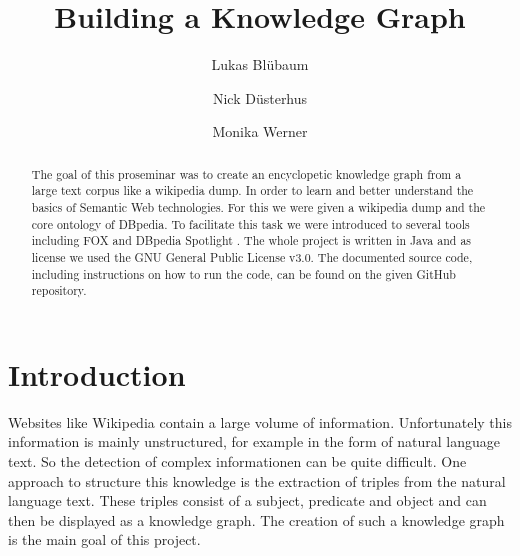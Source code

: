 \documentclass[runningheads]{llncs}
\begin{document}
%
\title{Building a Knowledge Graph}
%
%
\renewcommand*\labelitemi{\textbullet}
\author{Lukas Bl{\"u}baum \and Nick D{\"u}sterhus \and Monika Werner}
%
%
%
\maketitle              %
%
\begin{abstract}
The goal of this proseminar was to create an encyclopetic knowledge graph from a large text corpus like a wikipedia dump. In order to learn and better understand the basics of Semantic Web technologies. For this we were given a wikipedia dump and the core ontology of DBpedia. To facilitate this task we were introduced to several tools including FOX \cite{fox} and DBpedia Spotlight \cite{spotlight}. The whole project is written in Java and as license we used the GNU General Public License v3.0. The documented source code, including instructions on how to run the code, can be found on the given GitHub repository.

\end{abstract}


\section{Introduction}
Websites like Wikipedia contain a large volume of information. Unfortunately this information is mainly unstructured, for example in the form of natural language text. So the detection of complex informationen can be quite difficult. One approach to structure this knowledge is the extraction of triples from the natural language text. These triples consist of a subject, predicate and object and can then be displayed as a knowledge graph. The creation of such a knowledge graph is the main goal of this project. \\
\end{document}
